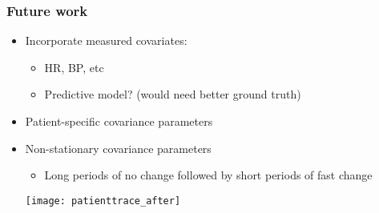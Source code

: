 \begin{frame}
	\frametitle{Future work}
	\begin{itemize}
		\item Incorporate measured covariates:
		\begin{itemize}
			\item HR, BP, etc
			\item Predictive model? (would need better ground truth)
		\end{itemize}
		\item Patient-specific covariance parameters
		\item Non-stationary covariance parameters
		\begin{itemize}
			\item Long periods of no change followed by short periods of fast change
		\end{itemize}
		\texttt{[image: patienttrace\_after]}
	\end{itemize}

\end{frame}